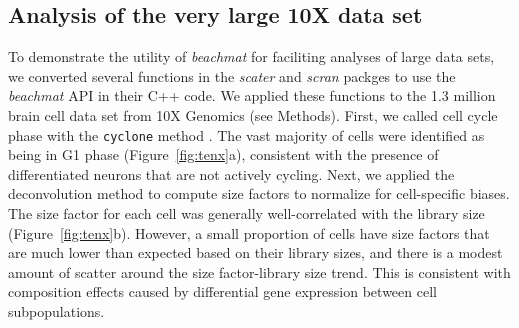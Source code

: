 \documentclass[10pt,letterpaper]{article}
\newcommand{\beachmat}{\textit{beachmat}}
\newcommand{\code}[1]{\texttt{#1}}
\begin{document}
\subsection*{Analysis of the very large 10X data set}
To demonstrate the utility of \beachmat{} for faciliting analyses of large data sets, we converted several functions in the \textit{scater} \cite{mccarthy2017scater} and \textit{scran} packges \cite{lun2016stepbystep} to use the \beachmat{} API in their C++ code.
We applied these functions to the 1.3 million brain cell data set from 10X Genomics (see Methods).
First, we called cell cycle phase with the \code{cyclone} method \cite{scialdone2015computational}. 
The vast majority of cells were identified as being in G1 phase (Figure~\ref{fig:tenx}a), consistent with the presence of differentiated neurons that are not actively cycling.
Next, we applied the deconvolution method \cite{lun2016pooling} to compute size factors to normalize for cell-specific biases.
The size factor for each cell was generally well-correlated with the library size (Figure~\ref{fig:tenx}b).
However, a small proportion of cells have size factors that are much lower than expected based on their library sizes, and there is a modest amount of scatter around the size factor-library size trend.
This is consistent with composition effects \cite{robinson2010scaling} caused by differential gene expression between cell subpopulations.
\end{document}
